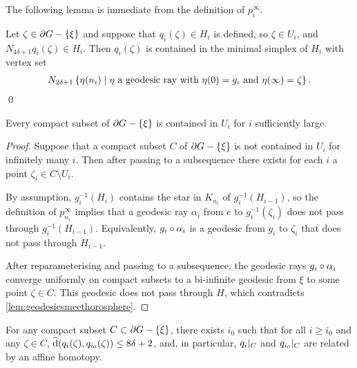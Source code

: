 \documentclass[a4paper]{article}
\begin{document}
The following lemma is immediate from the definition of $p^\infty_i$.

\begin{lemma}\label{lem:describing_q_i}
  Let $\zeta \in \partial G - \left\{\xi\right\}$ and suppose that $q_i(\zeta) \in H_i$
  is defined, so $\zeta \in U_i$, and $N_{4\delta+1} q_i(\zeta) \in H_i$. Then
  $q_i(\zeta)$ is contained in the minimal simplex of $H_i$ with vertex set
  \begin{align*}
    N_{2\delta+1} \left\{\eta(n_i)\mid\text{$\eta$ a geodesic ray with
    $\eta(0) = g_i$ and $\eta(\infty) = \zeta$}\right\}.
  \end{align*}\qed
\end{lemma}

\begin{lemma}
  Every compact subset of $\partial G - \left\{\xi\right\}$ is contained in $U_i$ for 
  $i$ sufficiently large.
\end{lemma} 

\begin{proof}
  Suppose that a compact subset $C$ of $\partial G - \left\{\xi\right\}$ is not contained
  in $U_i$ for infinitely many $i$. Then after passing to a subsequence there
  exists for each $i$ a point $\zeta_i \in C\setminus U_i$. 

  By assumption, $g_i^{-1}(H_i)$ contains the star in $K_{n_i}$ of 
  $g_i^{-1}(H_{i-1})$, so the definition of $p^\infty_{n_i}$ implies that a 
  geodesic ray $\alpha_i$ from $e$ to $g_i^{-1}(\zeta_i)$ does not pass through 
  $g_i^{-1}(H_{i-1})$. Equivalently, $g_i\circ\alpha_i$ is a geodesic from 
  $g_i$ to $\zeta_i$ that does not pass through $H_{i-1}$. 

  After reparameterising and passing to a subsequence, the geodesic rays
  $g_i\circ\alpha_i$ converge uniformly on compact subsets to a bi-infinite
  geodesic from $\xi$ to some point $\zeta \in C$.  This geodesic does not pass
  through $H$, which contradicts \cref{lem:geodesicsmeethorosphere}.
\end{proof}

\begin{lemma}\label{lem:affinehomotopic}
  For any compact subset $C\subset\partial G - \left\{\xi\right\}$, there exists $i_0$ 
  such that for all $i \geq i_0$ and any $\zeta \in C$, $\operatorname{\widehat{d}}(q_i(\zeta),
  q_{i_0}(\zeta)) \leq 8\delta + 2$, and, in particular, $q_i\vert_{C}$
  and $q_{i_0}\vert_{C}$ are related by an affine homotopy.
\end{lemma}
\end{document}
